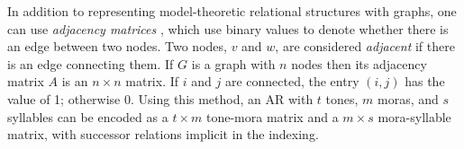 \documentclass{CUP-JNL-PHO}%
\theoremstyle{definition}
\numberwithin{equation}{section}
\theoremstyle{definition}
\begin{document}
In addition to representing model-theoretic relational structures 
with graphs, one can use \textit{adjacency matrices}
\citep{west2001introduction,CLRS2022}, which use binary values to
denote whether there is an edge between two nodes. Two nodes, $v$ and
$w$, are considered \textit{adjacent} if there is an edge connecting
them. If $G$ is a graph with $n$ nodes %
then its adjacency matrix $A$ is an $n \times n$ matrix. If $i$ and 
$j$ are connected, the entry $(i, j)$ has the value of 1; otherwise 
0. 
Using this method, an AR with $t$ tones, $m$ moras, and $s$ 
syllables can be encoded as a $t \times m$ tone-mora matrix and 
a $m \times s$ mora-syllable matrix, with successor relations 
implicit in the indexing. 
\end{document}
